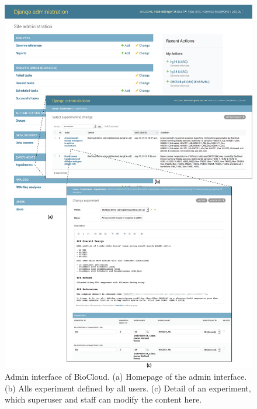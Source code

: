 \begin{figure}[!p]
\centering
\includegraphics[width=1\textwidth]{images/biocloud_admin}
\caption[Admin interface of BioCloud]{
    Admin interface of BioCloud.
    (a) Homepage of the admin interface.
    (b) Alls experiment defined by all users.
    (c) Detail of an experiment, which superuser and staff can modify the
        content here.
}
\label{fig:biocloud-admin}
\end{figure}


